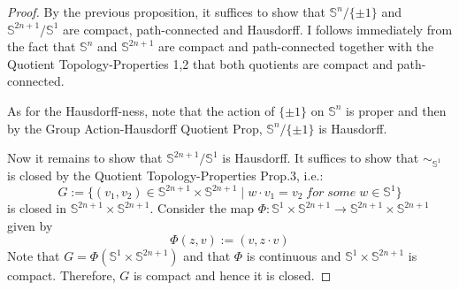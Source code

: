 \begin{proof}
    By the previous proposition, it suffices to show that $\mathbb{S}^n /\{ \pm1\}$ and $\mathbb{S}^{2n+1}/\mathbb{S}^1$ are compact, path-connected and Hausdorff. I follows immediately from the fact that $\mathbb{S}^n$ and $\mathbb{S}^{2n+1}$ are compact and path-connected together with the Quotient Topology-Properties 1,2 that both quotients are compact and path-connected.
    
    As for the Hausdorff-ness, note that the action of $\{\pm1\}$ on $\mathbb{S}^n$ is proper and then by the Group Action-Hausdorff Quotient Prop, $\mathbb{S}^n/ \{\pm1\}$ is Hausdorff.

    Now it remains to show that $\mathbb{S}^{2n+1}/ \mathbb{S}^1$ is Hausdorff. It suffices to show that $\sim_{\mathbb{S}^1}$ is closed by the Quotient Topology-Properties Prop.3, i.e.:
    $$G:= \{(v_1,v_2) \in \mathbb{S}^{2n+1} \times \mathbb{S}^{2n+1} \mid w \cdot v_1= v_2\; for\;some\; w\in \mathbb{S}^1\}$$
    is closed in $\mathbb{S}^{2n+1} \times \mathbb{S}^{2n+1}$. Consider the map $\Phi: \mathbb{S}^1 \times \mathbb{S}^{2n+1} \to \mathbb{S}^{2n+1} \times \mathbb{S}^{2n+1}$ given by
    $$\Phi (z,v) := (v, z\cdot v)$$
    Note that $G= \Phi(\mathbb{S}^1 \times \mathbb{S}^{2n+1})$ and that $\Phi$ is continuous and $\mathbb{S}^1 \times \mathbb{S}^{2n+1}$ is compact. Therefore, $G$ is compact and hence it is closed.
\end{proof}

